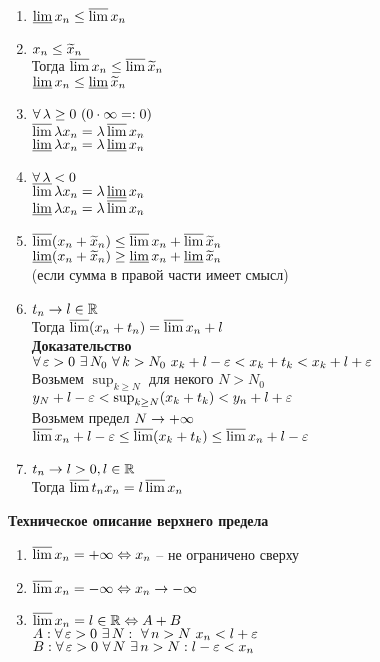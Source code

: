 \documentclass[12pt]{article}
\begin{document}
\begin{enumerate}
    \item $\dlim x_n \leq \ulim x_n$
    \item $x_n \leq \ot x_n$\\
    Тогда $\ulim x_n \leq \ulim \ot x_n$\\
    $\dlim x_n \leq \dlim \ot x_n$
    \item $\fall \lambda \geq 0\ (0\cdot \infty =: 0)$\\
    $\ulim \lambda x_n = \lambda \ulim x_n$\\
    $\dlim \lambda x_n = \lambda \dlim x_n$
    \item $\fall \lambda < 0 $\\
    $\ulim \lambda x_n = \lambda \dlim x_n$\\
    $\dlim \lambda x_n = \lambda \ulim x_n$
    \item $\ulim (x_n + \ot x_n) \leq \ulim x_n + \ulim \ot x_n$\\
    $\dlim (x_n + \ot x_n) \geq \dlim x_n + \dlim \ot x_n$\\
    (если сумма в правой части имеет смысл)
    \item $t_n \rto l \in \Rset$\\
    Тогда $\ulim (x_n + t_n) = \ulim x_n + l$\\
    \textbf{Доказательство}\\
    $\fall \eps > 0\ \ex N_0\ \fall k > N_0\ x_k + l - \eps < x_k + t_k < x_k + l + \eps$\\
    Возьмем $\sup_{k \geq N}$ для некого $N > N_0$\\
    $y_N + l - \eps < \sup_{k \geq N} (x_k + t_k) < y_n + l + \eps$\\
    Возьмем предел $N \rto +\infty$\\
    $\ulim x_n + l - \eps \leq \ulim (x_k + t_k) \leq \ulim x_n + l - \eps$
    \item $t_n \rto l>0, l \in \Rset$\\
    Тогда $\ulim t_nx_n = l\ulim x_n$
\end{enumerate}
\textbf{Техническое описание верхнего предела}
\begin{enumerate}
    \item $\ulim x_n = +\infty \LRto x_n$ -- не ограничено сверху
    \item $\ulim x_n = -\infty \LRto x_n \rto -\infty$
    \item $\ulim x_n = l \in \Rset \LRto A + B$\\
    $A: \fall \eps > 0\ \ex N:\ \fall n > N\ x_n < l + \eps$\\
    $B: \fall \eps > 0\ \fall N\ \ex n > N: l-\eps < x_n$
\end{enumerate}
\end{document}
